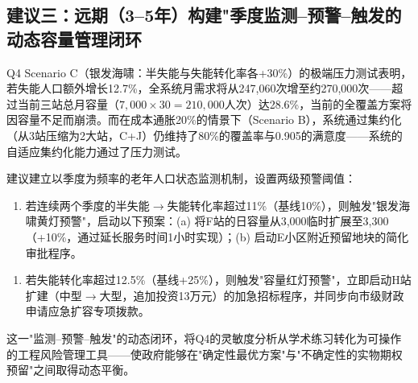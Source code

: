 \subsection{建议三：远期（3--5年）构建"季度监测--预警--触发的动态容量管理闭环}

Q4 Scenario C（银发海啸：半失能与失能转化率各+30\%）的极端压力测试表明，若失能人口额外增长12.7\%，全系统月需求将从247,060次增至约270,000次——超过当前三站总月容量（$7,000\times30=210,000$人次）达28.6\%，当前的全覆盖方案将因容量不足而崩溃。而在成本通胀20\%的情景下（Scenario B），系统通过集约化（从3站压缩为2大站，C+J）仍维持了80\%的覆盖率与0.905的满意度——系统的自适应集约化能力通过了压力测试。

建议建立以季度为频率的老年人口状态监测机制，设置两级预警阈值：
\begin{enumerate}[label=\textbf{黄灯预警：}, leftmargin=*]
    \item 若连续两个季度的半失能$\to$失能转化率超过11\%（基线10\%），则触发"银发海啸黄灯预警"，启动以下预案：(a) 将F站的日容量从3,000临时扩展至3,300（+10\%，通过延长服务时间1小时实现）；(b) 启动E小区附近预留地块的简化审批程序。
\end{enumerate}
\begin{enumerate}[label=\textbf{红灯预警：}, leftmargin=*]
    \item 若失能转化率超过12.5\%（基线+25\%），则触发"容量红灯预警"，立即启动H站扩建（中型$\to$大型，追加投资13万元）的加急招标程序，并同步向市级财政申请应急扩容专项拨款。
\end{enumerate}

这一"监测--预警--触发"的动态闭环，将Q4的灵敏度分析从学术练习转化为可操作的工程风险管理工具——使政府能够在"确定性最优方案"与"不确定性的实物期权预留"之间取得动态平衡。
